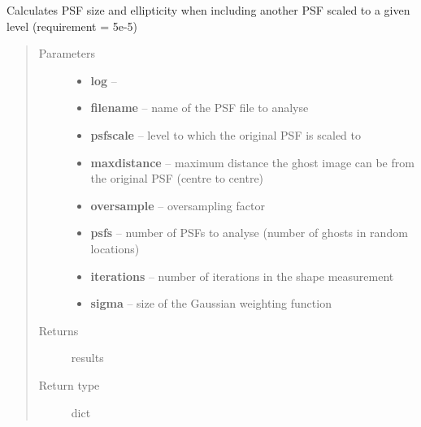 \documentclass[a4paper,11pt,english]{sphinxmanual}
\begin{document}
\begin{fulllineitems}
\label{reduction:analysis.analyseGhosts.analyseInFocusImpact}
Calculates PSF size and ellipticity when including another PSF scaled to a given level (requirement = 5e-5)
\begin{quote}\begin{description}
\item[{Parameters}] \leavevmode\begin{itemize}
\item {} 
\textbf{log} -- 

\item {} 
\textbf{filename} -- name of the PSF file to analyse

\item {} 
\textbf{psfscale} -- level to which the original PSF is scaled to

\item {} 
\textbf{maxdistance} -- maximum distance the ghost image can be from the original PSF (centre to centre)

\item {} 
\textbf{oversample} -- oversampling factor

\item {} 
\textbf{psfs} -- number of PSFs to analyse (number of ghosts in random locations)

\item {} 
\textbf{iterations} -- number of iterations in the shape measurement

\item {} 
\textbf{sigma} -- size of the Gaussian weighting function

\end{itemize}

\item[{Returns}] \leavevmode
results

\item[{Return type}] \leavevmode
dict

\end{description}\end{quote}

\end{fulllineitems}

\end{document}
